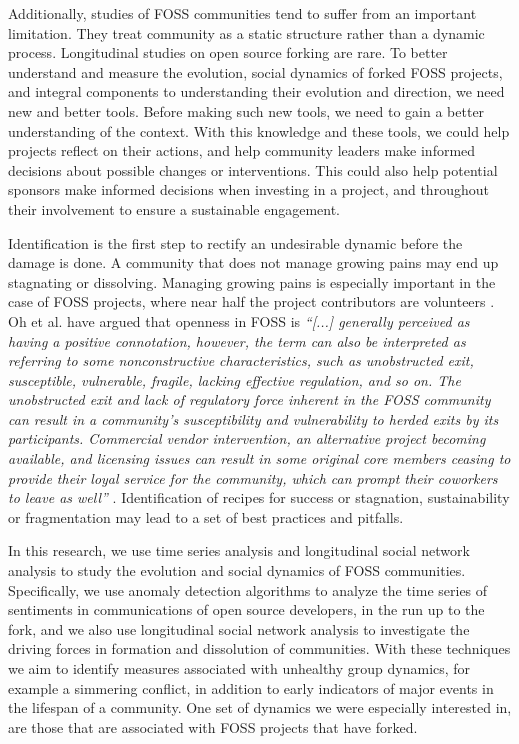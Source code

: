 \documentclass[12pt,letterpaper]{gthesis2}  %
\begin{document}
Additionally, studies of FOSS communities tend to suffer from an important limitation. They treat community as a static structure rather than a dynamic process. Longitudinal studies on open source forking are rare. To better understand and measure the evolution, social dynamics of forked FOSS projects, and integral components to understanding their evolution and direction, we need new and better tools. Before making such new tools, we need to gain a better understanding of the context. With this knowledge and these tools, we could help projects reflect on their actions, and help community leaders make informed decisions about possible changes or interventions. This could also help potential sponsors make informed decisions when investing in a project, and throughout their involvement to ensure a sustainable engagement. 

Identification is the first step to rectify an undesirable dynamic before the damage is done. A community that does not manage growing pains may end up stagnating or dissolving. Managing growing pains is especially important in the case of FOSS projects, where near half the project contributors are volunteers \cite{Forrest}. Oh et al. \cite{Oh} have argued that openness in FOSS is \textit{``[...] generally perceived as having a positive connotation, however, the term can also be interpreted as referring to some nonconstructive characteristics, such as unobstructed exit, susceptible, vulnerable, fragile, lacking effective regulation, and so on. The unobstructed exit and lack of regulatory force inherent in the FOSS community can result in a community's susceptibility and vulnerability to herded exits by its participants. Commercial vendor intervention, an alternative project becoming available, and licensing issues can result in some original core members ceasing to provide their loyal service for the community, which can prompt their coworkers to leave as well''} \cite{Oh}. Identification of recipes for success or stagnation, sustainability or fragmentation may lead to a set of best practices and pitfalls.

In this research, we use time series analysis and longitudinal social network analysis to study the evolution and social dynamics of FOSS communities. Specifically, we use anomaly detection algorithms to analyze the time series of sentiments in communications of open source developers, in the run up to the fork, and we also use longitudinal social network analysis to investigate the driving forces in formation and dissolution of communities. With these techniques we aim to identify measures associated with unhealthy group dynamics, for example a simmering conflict, in addition to early indicators of major events in the lifespan of a community. One set of dynamics we were especially interested in, are those that are associated with FOSS projects that have forked.
\end{document}
